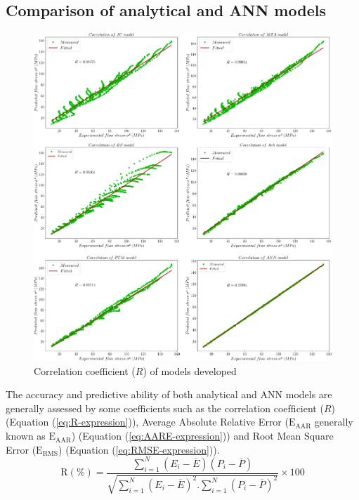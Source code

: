 \documentclass[twoside,english,1p,final,sort&compress]{elsarticle}
\theoremstyle{plain}
\newcommand{\RMSE}{\text{E}_\text{RMS}}
\newcommand{\AARE}{\text{E}_\text{AAR}}
\newcommand{\R}{\text{R}}
\begin{document}
\FloatBarrier
\subsection{Comparison of analytical and ANN models\label{sec:Comparison}}
\begin{figure}[!ht]
\centering
\includegraphics[width=1.02\columnwidth]
{Figures/Correlation}
\caption{Correlation coefficient ($R$) of models developed}
\label{fig:Correlation}
\end{figure}
The accuracy and predictive ability of both analytical and ANN models are generally assessed by some coefficients such as the correlation coefﬁcient ($R$) (Equation (\ref{eq:R-expression})), Average Absolute Relative Error ($\AARE$ generally known as $\AARE$) (Equation (\ref{eq:AARE-expression})) and Root Mean Square Error ($\RMSE$) (Equation (\ref{eq:RMSE-expression})).
\begin{equation}
\label{eq:R-expression}
\R(\%) = \frac{\displaystyle\sum_{i=1}^{N}{\left(E_i - \overline{E}\right)\left(P_i - \overline{P}\right)}}{\sqrt{\displaystyle\sum_{i=1}^{N}\left(E_i - \overline{E}\right)^2 .\displaystyle\sum_{i=1}^{N}\left(P_i - \overline{P}\right)^2}}\times 100
\end{equation}
\end{document}

